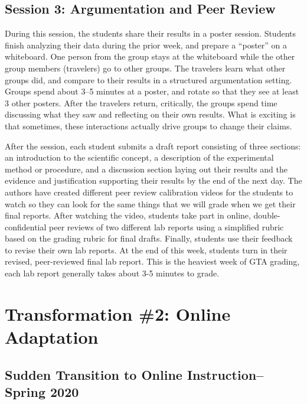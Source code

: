 \documentclass[aip, numerical, preprint]{revtex4-2}
\begin{document}
\subsection{Session 3: Argumentation and Peer Review}
During this session, the students share their results in a poster session.  Students finish analyzing
their data during the prior week, and prepare a ``poster'' on a whiteboard.  One person from
the group stays at the whiteboard while the other group members (travelers) go to other groups.
The travelers learn what other groups did, and compare to their results in a structured
argumentation setting.  Groups spend about 3--5 minutes at a poster, and rotate so that they
see at least 3 other posters.  After the travelers return, critically, the groups spend time
discussing what they saw and reflecting on their own results.  What is exciting is that
sometimes, these interactions actually drive groups to change their claims.\citep{Walker2019}

After the session, each student submits a draft report consisting of three sections: an introduction to the
scientific concept, a description of the experimental method or procedure, and a discussion
section laying out their results and the evidence and justification supporting their results by the end of the next day.
The authors have created different peer review calibration videos for the students to watch so
they can look for the same things that we will grade when we get their
final reports.  After watching the video, students take part in online, double-confidential peer reviews of two different lab reports using a simplified rubric based on the grading rubric for final drafts.
Finally, students use their feedback to revise their own lab reports.  At the end of
this week, students turn in their revised, peer-reviewed final lab report.  This is the
heaviest week of GTA grading, each lab report generally takes about 3-5 minutes to grade.

\section{Transformation \#2: Online Adaptation}

\subsection{Sudden Transition to Online Instruction--Spring 2020}
\end{document}
